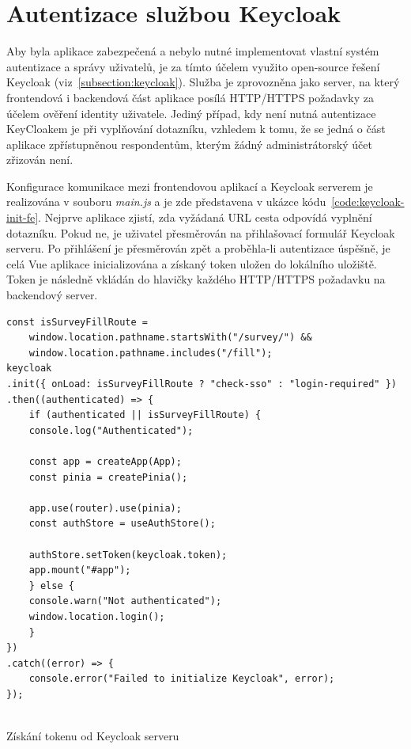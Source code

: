 \section{Autentizace službou Keycloak}
Aby byla aplikace zabezpečená a nebylo nutné implementovat vlastní systém autentizace a správy uživatelů,
je za tímto účelem využito open-source řešení Keycloak (viz~\ref{subsection:keycloak}). Služba je zprovozněna
jako server, na který frontendová i backendová část aplikace posílá HTTP/HTTPS požadavky za účelem ověření
identity uživatele. Jediný případ, kdy není nutná autentizace KeyCloakem je při vyplňování dotazníku,
vzhledem k tomu, že se jedná o část aplikace zpřístupněnou respondentům, kterým žádný administrátorský účet zřizován není.

Konfigurace komunikace mezi frontendovou aplikací a Keycloak serverem je realizována v souboru \textit{main.js} a je
zde představena v ukázce kódu~\ref{code:keycloak-init-fe}. Nejprve aplikace zjistí,
zda vyžádaná URL cesta odpovídá vyplnění dotazníku. Pokud ne, je uživatel přesměrován
na přihlašovací formulář Keycloak serveru. Po přihlášení je přesměrován zpět a proběhla-li
autentizace úspěšně, je celá Vue aplikace inicializována a získaný token uložen do lokálního uložiště.
Token je následně vkládán do hlavičky každého HTTP/HTTPS požadavku na backendový server.

\begin{listing}[h!]
    \begin{verbatim}
const isSurveyFillRoute =
    window.location.pathname.startsWith("/survey/") &&
    window.location.pathname.includes("/fill");
keycloak
.init({ onLoad: isSurveyFillRoute ? "check-sso" : "login-required" })
.then((authenticated) => {
    if (authenticated || isSurveyFillRoute) {
    console.log("Authenticated");

    const app = createApp(App);
    const pinia = createPinia();

    app.use(router).use(pinia);
    const authStore = useAuthStore();

    authStore.setToken(keycloak.token);
    app.mount("#app");
    } else {
    console.warn("Not authenticated");
    window.location.login();
    }
})
.catch((error) => {
    console.error("Failed to initialize Keycloak", error);
});


    \end{verbatim}
\caption{Získání tokenu od Keycloak serveru}
\label{code:keycloak-init-fe}
\end{listing}

